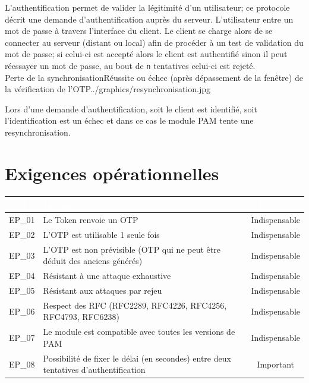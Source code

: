 \documentclass{"../../res/univ-projet"}
\begin{document}
L'authentification permet de valider la légitimité d'un utilisateur; ce protocole décrit une demande d'authentification auprès du serveur. L'utilisateur
entre un mot de passe à travers l'interface du client. Le client se charge alors de se connecter au serveur (distant ou local) afin de procéder à un test de validation du mot de passe; si celui-ci
est accepté alors le client est authentifié sinon il peut réessayer un mot de passe, au bout de \verb$n$ tentatives celui-ci est rejeté.
\\
{Perte de la synchronisation}{Réussite ou échec (après dépassement de la fenêtre) de la vérification de l'OTP}{../graphics/resynchronisation.jpg}{}

\vspace{0.5cm}

Lors d'une demande d'authentification, soit le client est identifié, soit l'identification est un échec et dans ce cas
le module PAM tente une resynchronisation.
\clearpage
\newpage
\section{Exigences opérationnelles}
\begin{tabular}{|c|l|c|}
    \hline
    \rowcolor{gray}
    \textcolor{white}{Id} & \textcolor{white}{Intitulé} & \textcolor{white}{Priorité}\\
    \hline
    EP\_01 & Le Token renvoie un OTP & Indispensable\\
    \hline
    EP\_02 & L'OTP est utilisable 1 seule fois & Indispensable\\
    \hline
    EP\_03 & L'OTP est non prévisible (OTP qui ne peut être déduit des anciens générés) & Indispensable\\
    \hline
    EP\_04 & Résistant à une attaque exhaustive & Indispensable\\
    \hline
    EP\_05 & Résistant aux attaques par rejeu & Indispensable\\
    \hline
    EP\_06 & Respect des RFC (RFC2289, RFC4226, RFC4256, RFC4793, RFC6238) & Indispensable\\
    \hline
    EP\_07 & Le module est compatible avec toutes les versions de PAM & Indispensable\\
    \hline
    EP\_08 & Possibilité de fixer le délai (en secondes) entre deux tentatives d'authentification & Important\\
    \hline
\end{tabular}
\end{document}
